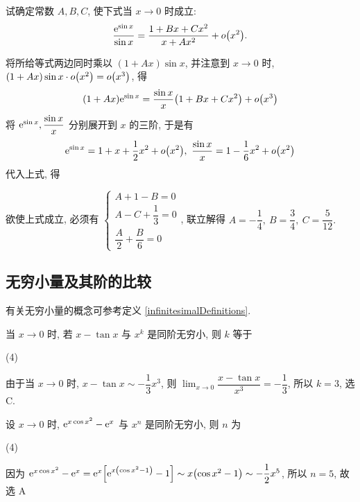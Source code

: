 \begin{example}
    试确定常数 $A,B,C$, 使下式当 $x\to0 $ 时成立:
    $$\dfrac{\mathrm{e}^{\sin x}}{\sin x}=\dfrac{1+Bx+Cx^2}{x+Ax^2}+o\qty(x^2).$$
\end{example}
\begin{solution}
    将所给等式两边同时乘以 $(1+Ax)\sin x$, 并注意到 $x\to0$ 时, $(1+Ax)\sin x\cdot o\qty(x^2)=o\qty(x^3)$, 得
    $$(1+Ax)\mathrm{e}^{\sin x}=\dfrac{\sin x}{x}\qty(1+Bx+Cx^2)+o\qty(x^3)$$
    将 $\mathrm{e}^{\sin x},\dfrac{\sin x}{x}$ 分别展开到 $x$ 的三阶, 于是有
    $$\mathrm{e}^{\sin x}=1+x+\dfrac{1}{2}x^2+o\qty(x^2),~\dfrac{\sin x}{x}=1-\dfrac{1}{6}x^2+o\qty(x^2)$$
    代入上式, 得
    欲使上式成立, 必须有 $\begin{cases}
            A+1-B=0 \\[6pt]A-C+\dfrac{1}{3}=0\\[6pt]\dfrac{A}{2}+\dfrac{B}{6}=0
        \end{cases}$, 联立解得 $A=-\dfrac{1}{4},~B=\dfrac{3}{4},~C=\dfrac{5}{12}.$
\end{solution}

\subsection{无穷小量及其阶的比较}

有关无穷小量的概念可参考定义 \ref{infinitesimalDefinitions}.

\begin{example}[2019 数一]
    当 $x\to0$ 时, 若 $x-\tan x$ 与 $x^{k}$ 是同阶无穷小, 则 $k$ 等于 
    \begin{tasks}(4)
    \end{tasks}
\end{example}
\begin{solution}
    由于当 $x\to0$ 时, $x-\tan x\sim-\dfrac{1}{3}x^3$, 则 $\displaystyle\lim_{x\to0}\dfrac{x-\tan x}{x^3}=-\dfrac{1}{3}$, 所以 $k=3$, 选 C.
\end{solution}

\begin{example}
    设 $x\to0$ 时, $\mathrm{e} ^{x\cos x^2}-\mathrm{e} ^{x}$ 与 $x^n$ 是同阶无穷小, 则 $n $ 为
    \begin{tasks}(4)
    \end{tasks}
\end{example}
\begin{solution}
    因为 $\mathrm{e} ^{x\cos x^2}-\mathrm{e} ^{x}=\mathrm{e}^x\qty[\mathrm{e} ^{x\qty(\cos x^2-1)}-1]\sim x\qty(\cos x^2-1)\sim -\dfrac{1}{2}x^5$, 所以 $n=5$, 故选 A
\end{solution}

